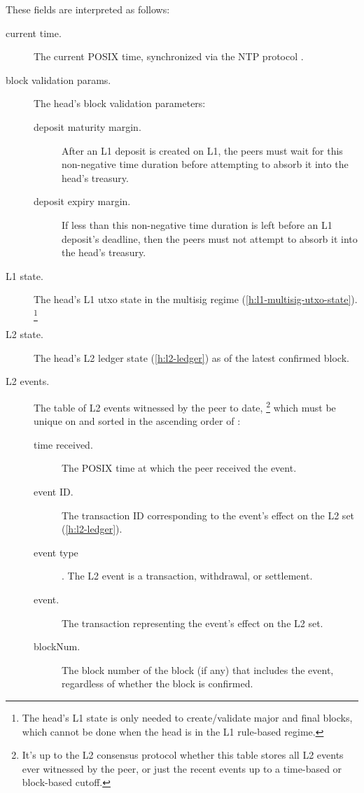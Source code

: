 \documentclass[../hydrozoa.tex]{subfiles}
\begin{document}
These fields are interpreted as follows:
\begin{description}
  \item[current time.] The current POSIX time, synchronized via the NTP protocol \citep{MillsEtAlNetworkTimeProtocol2010}.
  \item[block validation params.] The head's block validation parameters:
    \begin{description}
      \item[deposit maturity margin.] After an L1 deposit is created on L1, the peers must wait for this non-negative time duration before attempting to absorb it into the head's treasury.
      \item[deposit expiry margin.] If less than this non-negative time duration is left before an L1 deposit's deadline, then the peers must not attempt to absorb it into the head's treasury.
    \end{description}
  \item[L1 state.] The head's L1 utxo state in the multisig regime (\cref{h:l1-multisig-utxo-state}).%
    \footnote{The head's L1 state is only needed to create/validate major and final blocks, which cannot be done when the head is in the L1 rule-based regime.}
  \item[L2 state.] The head's L2 ledger state (\cref{h:l2-ledger}) as of the latest confirmed block.
  \item[L2 events.] The table of L2 events witnessed by the peer to date,%
    \footnote{It's up to the L2 consensus protocol whether this table stores all L2 events ever witnessed by the peer, or just the recent events up to a time-based or block-based cutoff.}
    which must be unique on  and sorted in the ascending order of :
    \begin{description}
      \item[time received.] The POSIX time at which the peer received the event.
      \item[event ID.] The transaction ID corresponding to the event's effect on the L2  set (\cref{h:l2-ledger}).
      \item[event type]. The L2 event is a transaction, withdrawal, or settlement.
      \item[event.] The transaction representing the event's effect on the L2  set.
      \item[blockNum.] The block number of the block (if any) that includes the event, regardless of whether the block is confirmed.
    \end{description}
\end{description}
\end{document}
